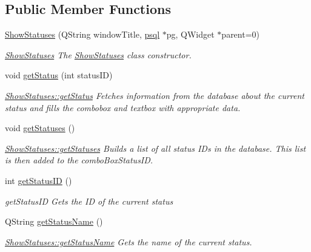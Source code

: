\subsection*{Public Member Functions}
\begin{DoxyCompactItemize}
\item 
\hyperlink{class_show_statuses_a5f33b2e8d68add734ceb466de0fc80ae}{Show\+Statuses} (Q\+String window\+Title, \hyperlink{classpsql}{psql} $\ast$pg, Q\+Widget $\ast$parent=0)
\begin{DoxyCompactList}\small\item\em \hyperlink{class_show_statuses}{Show\+Statuses} The \hyperlink{class_show_statuses}{Show\+Statuses} class constructor. \end{DoxyCompactList}\item 
void \hyperlink{class_show_statuses_a688fb68ab4f0e65666b61137aa70aed9}{get\+Status} (int status\+ID)
\begin{DoxyCompactList}\small\item\em \hyperlink{class_show_statuses_a688fb68ab4f0e65666b61137aa70aed9}{Show\+Statuses\+::get\+Status} Fetches information from the database about the current status and fills the combobox and textbox with appropriate data. \end{DoxyCompactList}\item 
\mbox{\label{class_show_statuses_a78ceb898d01bd2892e1ef942672666ec}} 
void \hyperlink{class_show_statuses_a78ceb898d01bd2892e1ef942672666ec}{get\+Statuses} ()
\begin{DoxyCompactList}\small\item\em \hyperlink{class_show_statuses_a78ceb898d01bd2892e1ef942672666ec}{Show\+Statuses\+::get\+Statuses} Builds a list of all status I\+Ds in the database. This list is then added to the combo\+Box\+Status\+ID. \end{DoxyCompactList}\item 
int \hyperlink{class_show_statuses_accb269831b12a839751cb7ae2822dfe1}{get\+Status\+ID} ()
\begin{DoxyCompactList}\small\item\em get\+Status\+ID Gets the ID of the current status \end{DoxyCompactList}\item 
Q\+String \hyperlink{class_show_statuses_a311ebb73bbc52089506fb31d7936bcb3}{get\+Status\+Name} ()
\begin{DoxyCompactList}\small\item\em \hyperlink{class_show_statuses_a311ebb73bbc52089506fb31d7936bcb3}{Show\+Statuses\+::get\+Status\+Name} Gets the name of the current status. \end{DoxyCompactList}\item 

\end{DoxyCompactItemize}
